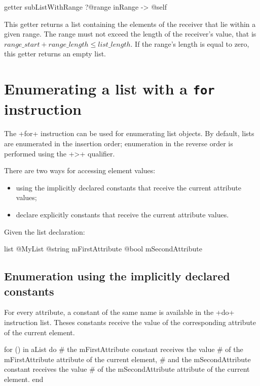 \begin{galgas3}
getter subListWithRange
  ?@range inRange
  -> @self
\end{galgas3}

This getter returns a list containing the elements of the receiver that lie within a given range. The range must not exceed the length of the receiver's value, that is $range\_start + range\_length \leqslant list\_length$. If the range's length is equal to zero, this getter returns an empty list.















\section{Enumerating a list with a \texttt{for} instruction}

The \ggst+for+ instruction can be used for enumerating list objects. By default, lists are enumerated in the insertion order; enumeration in the reverse order is performed using the \ggst+>+ qualifier.

There are two ways for accessing element values:
\begin{itemize}
\item using the implicitly declared constants that receive the current attribute values;
\item declare explicitly constants that receive the current attribute values.
\end{itemize}

Given the list declaration:

\begin{galgas3}
list @MyList {
  @string mFirstAttribute
  @bool mSecondAttribute
}
\end{galgas3}

\subsection{Enumeration using the implicitly declared constants}

For every attribute, a constant of the same name is available in the \ggst+do+ instruction list. Theses constants receive the value of the corresponding attribute of the current element.

\begin{galgas3}
for () in aList do
  # the mFirstAttribute constant receives the value
  # of the mFirstAttribute attribute of the current element,
  # and the mSecondAttribute constant receives the value
  # of the mSecondAttribute attribute of the current element.
end
\end{galgas3}

